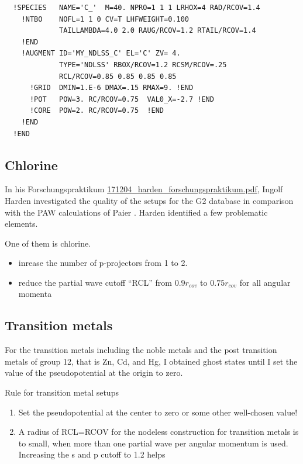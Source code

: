 \documentclass[11pt,a4paper]{report}
\begin{document}
\begin{verbatim}
  !SPECIES   NAME='C_'  M=40. NPRO=1 1 1 LRHOX=4 RAD/RCOV=1.4
    !NTBO    NOFL=1 1 0 CV=T LHFWEIGHT=0.100
             TAILLAMBDA=4.0 2.0 RAUG/RCOV=1.2 RTAIL/RCOV=1.4 
    !END 
    !AUGMENT ID='MY_NDLSS_C' EL='C' ZV= 4.
             TYPE='NDLSS' RBOX/RCOV=1.2 RCSM/RCOV=.25
             RCL/RCOV=0.85 0.85 0.85 0.85 
      !GRID  DMIN=1.E-6 DMAX=.15 RMAX=9. !END
      !POT   POW=3. RC/RCOV=0.75  VAL0_X=-2.7 !END
      !CORE  POW=2. RC/RCOV=0.75  !END
    !END
  !END
\end{verbatim}
 
\subsection{Chlorine}
In his Forschungspraktikum
\url{171204_harden_forschungspraktikum.pdf}, Ingolf Harden
investigated the quality of the setups for the G2 database in
comparison with the PAW calculations of Paier
\cite{paier05_jcp122_234102}. Harden identified a few problematic elements.

One of them is chlorine. 
\begin{itemize}
\item inrease the number of p-projectors from 1 to 2.
\item reduce the partial wave cutoff ``RCL'' from $0.9 r_{cov}$ to
  $0.75 r_{cov}$ for all angular momenta
\end{itemize}





\subsection{Transition metals}
For the transition metals including the noble metals and the post
transition metals of group 12, that is Zn, Cd, and Hg, I obtained
ghost states until I set the value of the pseudopotential at the
origin to zero.

\begin{myshadowminipage}{Rule for transition metal setups}
\begin{enumerate}
\item Set the pseudopotential at the center to zero or some other
  well-chosen value!
\item A radius of RCL=RCOV for the nodeless construction for
  transition metals is to small, when more than one partial wave per
  angular momentum is used. Increasing the s and p cutoff to 1.2 helps
\end{enumerate}
\end{myshadowminipage}
\end{document}
